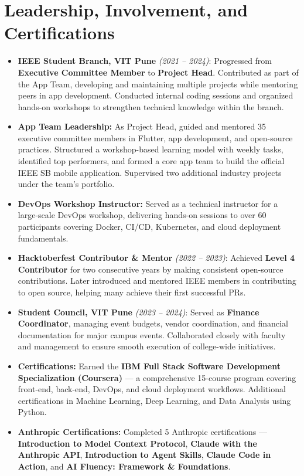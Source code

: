 \documentclass{article}
\begin{document}
\section{Leadership, Involvement, and Certifications}
\small
\begin{itemize}[leftmargin=*, itemsep=1pt, topsep=1pt]

  \item \textbf{IEEE Student Branch, VIT Pune} \emph{(2021 -- 2024)}:
  Progressed from \textbf{Executive Committee Member} to \textbf{Project Head}. Contributed as part of the App Team, developing and maintaining multiple projects while mentoring peers in app development. Conducted internal coding sessions and organized hands-on workshops to strengthen technical knowledge within the branch.

  \item \textbf{App Team Leadership:}
  As Project Head, guided and mentored 35 executive committee members in Flutter, app development, and open-source practices. Structured a workshop-based learning model with weekly tasks, identified top performers, and formed a core app team to build the official IEEE SB mobile application. Supervised two additional industry projects under the team’s portfolio.

  \item \textbf{DevOps Workshop Instructor:}
  Served as a technical instructor for a large-scale DevOps workshop, delivering hands-on sessions to over 60 participants covering Docker, CI/CD, Kubernetes, and cloud deployment fundamentals.

  \item \textbf{Hacktoberfest Contributor \& Mentor} \emph{(2022 -- 2023)}:
  Achieved \textbf{Level 4 Contributor} for two consecutive years by making consistent open-source contributions. Later introduced and mentored IEEE members in contributing to open source, helping many achieve their first successful PRs.

  \item \textbf{Student Council, VIT Pune} \emph{(2023 -- 2024)}:
  Served as \textbf{Finance Coordinator}, managing event budgets, vendor coordination, and financial documentation for major campus events. Collaborated closely with faculty and management to ensure smooth execution of college-wide initiatives.

  \item \textbf{Certifications:}
  Earned the \textbf{IBM Full Stack Software Development Specialization (Coursera)} — a comprehensive 15-course program covering front-end, back-end, DevOps, and cloud deployment workflows. Additional certifications in Machine Learning, Deep Learning, and Data Analysis using Python.

  \item \textbf{Anthropic Certifications:}
  Completed 5 Anthropic certifications — \textbf{Introduction to Model Context Protocol}, \textbf{Claude with the Anthropic API}, \textbf{Introduction to Agent Skills}, \textbf{Claude Code in Action}, and \textbf{AI Fluency: Framework \& Foundations}.

\end{itemize}
\end{document}
